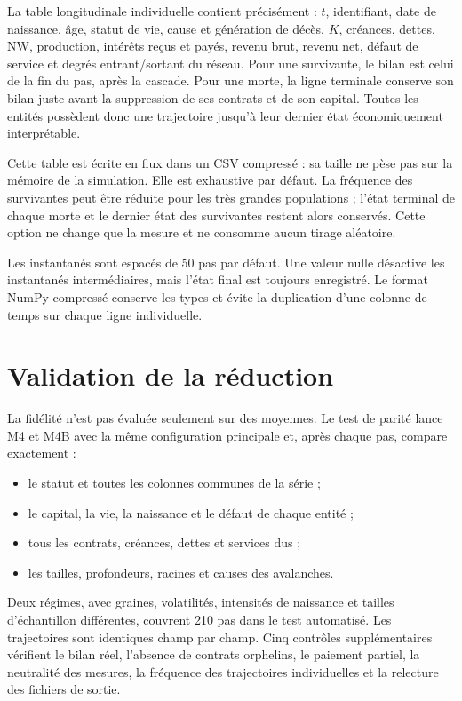 \documentclass[11pt,a4paper]{article}
\newcommand{\NW}{\mathrm{NW}}
\begin{document}
La table longitudinale individuelle contient précisément : $t$, identifiant,
date de naissance, âge, statut de vie, cause et génération de décès, $K$,
créances, dettes, $\NW$, production, intérêts reçus et payés, revenu brut,
revenu net, défaut de service et degrés entrant/sortant du réseau. Pour une
survivante, le bilan est celui de la fin du pas, après la cascade. Pour une
morte, la ligne terminale conserve son bilan juste avant la suppression de
ses contrats et de son capital. Toutes les entités possèdent donc une
trajectoire jusqu'à leur dernier état économiquement interprétable.

Cette table est écrite en flux dans un CSV compressé : sa taille ne pèse pas
sur la mémoire de la simulation. Elle est exhaustive par défaut. La fréquence
des survivantes peut être réduite pour les très grandes populations ; l'état
terminal de chaque morte et le dernier état des survivantes restent alors
conservés. Cette option ne change que la mesure et ne consomme aucun tirage
aléatoire.

Les instantanés sont espacés de 50 pas par défaut. Une valeur nulle désactive
les instantanés intermédiaires, mais l'état final est toujours enregistré.
Le format NumPy compressé conserve les types et évite la duplication d'une
colonne de temps sur chaque ligne individuelle.

\section{Validation de la réduction}

La fidélité n'est pas évaluée seulement sur des moyennes. Le test de parité
lance M4 et M4B avec la même configuration principale et, après chaque pas,
compare exactement :

\begin{itemize}
\item le statut et toutes les colonnes communes de la série ;
\item le capital, la vie, la naissance et le défaut de chaque entité ;
\item tous les contrats, créances, dettes et services dus ;
\item les tailles, profondeurs, racines et causes des avalanches.
\end{itemize}

Deux régimes, avec graines, volatilités, intensités de naissance et tailles
d'échantillon différentes, couvrent 210 pas dans le test automatisé. Les
trajectoires sont identiques champ par champ. Cinq contrôles supplémentaires
vérifient le bilan réel, l'absence de contrats orphelins, le paiement partiel,
la neutralité des mesures, la fréquence des trajectoires individuelles et la
relecture des fichiers de sortie.
\end{document}
